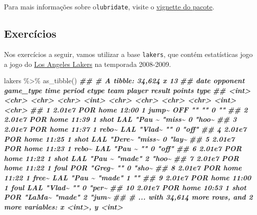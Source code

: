 \documentclass[
]{book}
\newenvironment{Shaded}{\begin{snugshade}}{\end{snugshade}}
\newcommand{\DocumentationTok}[1]{\textcolor[rgb]{0.56,0.35,0.01}{\textbf{\textit{#1}}}}
\newcommand{\FunctionTok}[1]{\textcolor[rgb]{0.00,0.00,0.00}{#1}}
\newcommand{\NormalTok}[1]{#1}
\newcommand{\SpecialCharTok}[1]{\textcolor[rgb]{0.00,0.00,0.00}{#1}}
\begin{document}
Para mais informações sobre o\texttt{lubridate}, visite o \href{https://cran.r-project.org/web/packages/lubridate/vignettes/lubridate.html}{vignette do pacote}.

\hypertarget{exercuxedcios-20}{%
\subsection{Exercícios}\label{exercuxedcios-20}}

Nos exercícios a seguir, vamos utilizar a base \texttt{lakers}, que contém estatísticas jogo a jogo do \href{http://www.nba.com/lakers/}{Los Angeles Lakers} na temporada 2008-2009.

\begin{Shaded}
\begin{Highlighting}[]
\NormalTok{lakers }\SpecialCharTok{\%\textgreater{}\%} \FunctionTok{as\_tibble}\NormalTok{()}
\DocumentationTok{\#\# \# A tibble: 34,624 x 13}
\DocumentationTok{\#\#      date opponent game\_type time  period etype team  player result points type }
\DocumentationTok{\#\#     \textless{}int\textgreater{} \textless{}chr\textgreater{}    \textless{}chr\textgreater{}     \textless{}chr\textgreater{}  \textless{}int\textgreater{} \textless{}chr\textgreater{} \textless{}chr\textgreater{} \textless{}chr\textgreater{}  \textless{}chr\textgreater{}   \textless{}int\textgreater{} \textless{}chr\textgreater{}}
\DocumentationTok{\#\#  1 2.01e7 POR      home      12:00      1 jump\textasciitilde{} OFF   ""     ""          0 ""   }
\DocumentationTok{\#\#  2 2.01e7 POR      home      11:39      1 shot  LAL   "Pau \textasciitilde{} "miss\textasciitilde{}      0 "hoo\textasciitilde{}}
\DocumentationTok{\#\#  3 2.01e7 POR      home      11:37      1 rebo\textasciitilde{} LAL   "Vlad\textasciitilde{} ""          0 "off"}
\DocumentationTok{\#\#  4 2.01e7 POR      home      11:25      1 shot  LAL   "Dere\textasciitilde{} "miss\textasciitilde{}      0 "lay\textasciitilde{}}
\DocumentationTok{\#\#  5 2.01e7 POR      home      11:23      1 rebo\textasciitilde{} LAL   "Pau \textasciitilde{} ""          0 "off"}
\DocumentationTok{\#\#  6 2.01e7 POR      home      11:22      1 shot  LAL   "Pau \textasciitilde{} "made"      2 "hoo\textasciitilde{}}
\DocumentationTok{\#\#  7 2.01e7 POR      home      11:22      1 foul  POR   "Greg\textasciitilde{} ""          0 "sho\textasciitilde{}}
\DocumentationTok{\#\#  8 2.01e7 POR      home      11:22      1 free\textasciitilde{} LAL   "Pau \textasciitilde{} "made"      1 ""   }
\DocumentationTok{\#\#  9 2.01e7 POR      home      11:00      1 foul  LAL   "Vlad\textasciitilde{} ""          0 "per\textasciitilde{}}
\DocumentationTok{\#\# 10 2.01e7 POR      home      10:53      1 shot  POR   "LaMa\textasciitilde{} "made"      2 "jum\textasciitilde{}}
\DocumentationTok{\#\# \# ... with 34,614 more rows, and 2 more variables: x \textless{}int\textgreater{}, y \textless{}int\textgreater{}}
\end{Highlighting}
\end{Shaded}
\end{document}
